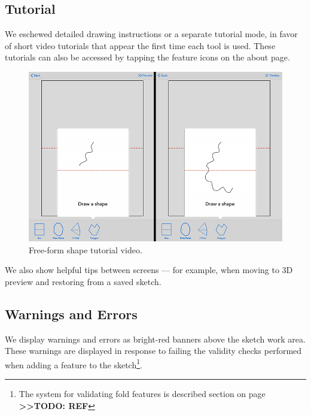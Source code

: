 \subsection{Tutorial}\label{tutorial}

We eschewed detailed drawing instructions or a separate tutorial mode,
in favor of short video tutorials that appear the first time each tool
is used. These tutorials can also be accessed by tapping the feature
icons on the about page.

\begin{figure}[htbp]
\centering
\includegraphics{figures/32_UI_Tool_Interactions/tutorial_step_one_two.png}
\caption{Free-form shape tutorial video.}
\end{figure}

We also show helpful tips between screens --- for example, when moving
to 3D preview and restoring from a saved sketch.

\subsection{Warnings and Errors}\label{warnings-and-errors}

We display warnings and errors as bright-red banners above the sketch
work area. These warnings are displayed in response to failing the
validity checks performed when adding a feature to the sketch\footnote{The
  system for validating fold features is described section on page
  \textbf{\textgreater{}\textgreater{}TODO: REF}}.

